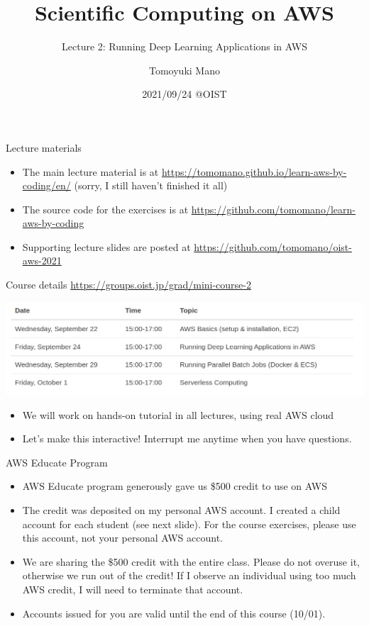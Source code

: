 \documentclass[unicode,11pt]{beamer}
\title{Scientific Computing on AWS}
\subtitle{Lecture 2: Running Deep Learning Applications in AWS}
\author{Tomoyuki Mano}
\institute[OIST]{Okinawa Institute of Science and Technology}
\date{2021/09/24 @OIST}
\begin{document}
\frame{\titlepage}

\begin{frame}{Lecture materials}
\begin{itemize}
    \item The main lecture material is at
    \url{https://tomomano.github.io/learn-aws-by-coding/en/}
    (sorry, I still haven't finished it all)
    \item The source code for the exercises is at
    \url{https://github.com/tomomano/learn-aws-by-coding}
    \item Supporting lecture slides are posted at
    \url{https://github.com/tomomano/oist-aws-2021}
\end{itemize}
\end{frame}

\begin{frame}{Course details}
\centering
\url{https://groups.oist.jp/grad/mini-course-2}

\vspace{10pt}

\includegraphics[width=1.0\textwidth]{imgs/schedule.png}

\begin{itemize}
    \item We will work on hands-on tutorial in all lectures, using real AWS cloud
    \item Let's make this interactive! Interrupt me anytime when you have questions.
\end{itemize}
\end{frame}

\begin{frame}{AWS Educate Program}

\begin{itemize}
    \item AWS Educate program generously gave us \$500 credit to use on AWS
    \item The credit was deposited on my personal AWS account.
    I created a child account for each student (see next slide).
    For the course exercises, please use this account, not your personal AWS account.
    \item We are sharing the \$500 credit with the entire class.
    Please do not overuse it, otherwise we run out of the credit!
    If I observe an individual using too much AWS credit, I will need to terminate that account.
    \item Accounts issued for you are valid until the end of this course (10/01).
\end{itemize}
\end{frame}
\end{document}
